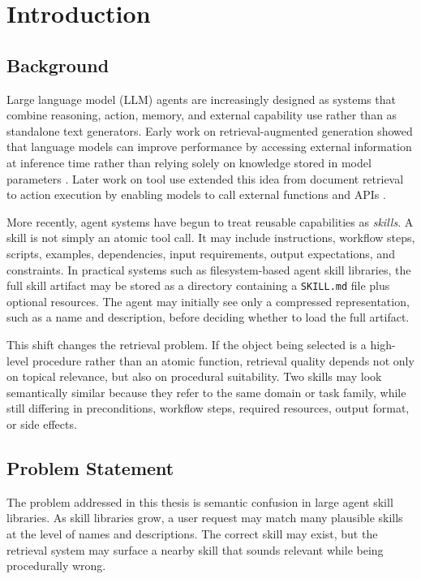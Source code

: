 \chapter{Introduction}

\section{Background}

Large language model (LLM) agents are increasingly designed as systems that combine reasoning, action, memory, and external capability use rather than as standalone text generators. Early work on retrieval-augmented generation showed that language models can improve performance by accessing external information at inference time rather than relying solely on knowledge stored in model parameters \cite{lewis2021rag, izacard2022atlas}. Later work on tool use extended this idea from document retrieval to action execution by enabling models to call external functions and APIs \cite{schick2023toolformer, patil2023gorilla, qin2023toolllm}.

More recently, agent systems have begun to treat reusable capabilities as \emph{skills}. A skill is not simply an atomic tool call. It may include instructions, workflow steps, scripts, examples, dependencies, input requirements, output expectations, and constraints. In practical systems such as filesystem-based agent skill libraries, the full skill artifact may be stored as a directory containing a \texttt{SKILL.md} file plus optional resources. The agent may initially see only a compressed representation, such as a name and description, before deciding whether to load the full artifact.

This shift changes the retrieval problem. If the object being selected is a high-level procedure rather than an atomic function, retrieval quality depends not only on topical relevance, but also on procedural suitability. Two skills may look semantically similar because they refer to the same domain or task family, while still differing in preconditions, workflow steps, required resources, output format, or side effects.

\section{Problem Statement}

The problem addressed in this thesis is semantic confusion in large agent skill libraries. As skill libraries grow, a user request may match many plausible skills at the level of names and descriptions. The correct skill may exist, but the retrieval system may surface a nearby skill that sounds relevant while being procedurally wrong.


